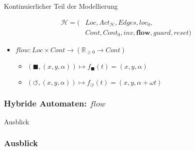\documentclass[ngerman]{beamer}
\begin{document}
\begin{section}{Kontinuierlicher Teil der Modellierung}
\begin{frame}
    \begin{align*}
        \mathcal{H} = ( & \mathit{Loc}, \mathit{Act}_{\mathcal{H}}, \mathit{Edges}, \mathit{loc}_0, \\
                        & \mathit{Cont}, \mathit{Cont}_0, \mathit{inv}, \mathbf{flow}, \mathit{guard}, \mathit{reset} )
    \end{align*}

    \begin{itemize}
        \item $\mathit{flow}: \mathit{Loc} \times \mathit{Cont} \rightarrow (\mathbb{R}_{\ge 0} \rightarrow \mathit{Cont}) $
            \begin{itemize}
                \item $(\blacksquare, (x, y, \alpha)) \mapsto f_\blacksquare(t) = (x, y, \alpha)$
                \item $(\circlearrowleft, (x, y, \alpha)) \mapsto f_\circlearrowleft(t) = (x, y, \alpha + \omega t)$
            \end{itemize}
    \end{itemize}
\end{frame}

\begin{frame}
    \frametitle{Hybride Automaten: $\mathit{flow}$}
\end{frame}

\end{section}
\begin{section}{Ausblick}

\begin{frame}
    \frametitle{Ausblick}
\end{frame}

\end{section}
\end{document}
